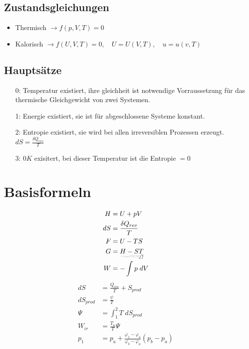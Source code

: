 \documentclass[twocolumn]{article}
\begin{document}
\subsection*{Zustandsgleichungen}
\begin{itemize}
	\item Thermisch $\rightarrow f(p, V, T) = 0$ 
	\item Kalorisch $\rightarrow f(U, V, T) = 0, \quad  U = U(V,T), \quad u = u(v,T)$ 
\end{itemize}

\subsection*{Hauptsätze}
\normalsize 
\begin{itemize}
	\item[0:] Temperatur existiert, ihre gleichheit ist notwendige Vorraussetzung für das thermische Gleichgewicht von zwei Systemen. 
	\item[1:] Energie existiert, sie ist für abgeschlossene Systeme konstant.  
	\item[2:] Entropie existiert, sie wird bei allen irreversiblen Prozessen erzeugt. $dS = \frac{\delta Q_{rev}}{T}$
	\item[3:] $0K$ exisitert, bei dieser Temperatur ist die Entropie $= 0$ 
\end{itemize}

%                                                                

\section{Basisformeln}

\begin{multicols}{2}
\begin{align*}
	H 	&=	U + pV 				\\ 	
       	dS 	&=	\frac{\delta Q_{rev}}{T}	\\
	F 	&=	U-TS 				\\
	G 	&=	\underrightswishingghost{H-ST}	\\
	W 	&=	-\int_{}^{} p\; dV		\\
	\end{align*}
	\begin{align*}
       	dS 		&=  	\frac{Q_{rev}}{T} + S_{prod}	\\
	dS_{prod}	&=	\frac{\psi}{T} 			\\
	\Psi 		&= 	\int_{1}^{2} T\; dS_{prod}	\\
	W_{ir}		&=	\frac{T_u}{T}\Psi		\\
	p_1 		&= p_a  + \frac{\varphi_1 - \varphi_a}{\varphi_b- \varphi_a}(p_b - p_a) \\
\end{align*}
\end{multicols}
\end{document}
